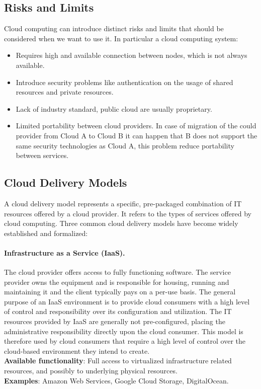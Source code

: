 \subsection{Risks and Limits}
Cloud computing can introduce distinct risks and limits that should be considered when we want to use it. In particular a cloud computing system:
\begin{itemize}
	\item Requires high and available connection between nodes, which is not always available.
	\item Introduce security problems like authentication on the usage of shared resources and private resources.
	\item Lack of industry standard, public cloud are usually proprietary.
	\item Limited portability between cloud providers. In case of migration of the could provider from Cloud A to Cloud B it can happen that B does not support the same security technologies as Cloud A, this problem reduce portability between services.
\end{itemize}

\subsection{Cloud Delivery Models}
A cloud delivery model represents a specific, pre-packaged combination of IT resources offered by a cloud provider. It refers to the types of services offered by cloud computing. Three common cloud delivery models have become widely established and formalized:

\paragraph{Infrastructure as a Service (IaaS).} The cloud provider offers access to fully functioning software. The service provider owns the equipment and is responsible for housing, running and maintaining it and the client typically pays on a per-use basis. The general purpose of an IaaS environment is to provide cloud consumers with a high level of control and responsibility over its configuration and utilization. The IT resources provided by IaaS are generally not pre-configured, placing the administrative responsibility directly upon the cloud consumer. This model is therefore used by cloud consumers that require a high level of control over the cloud-based environment they intend to create. \\
\textbf{Available functionality}: Full access to virtualized infrastructure related resources, and possibly to underlying physical resources. \\
\textbf{Examples}: Amazon Web Services, Google Cloud Storage, DigitalOcean.

